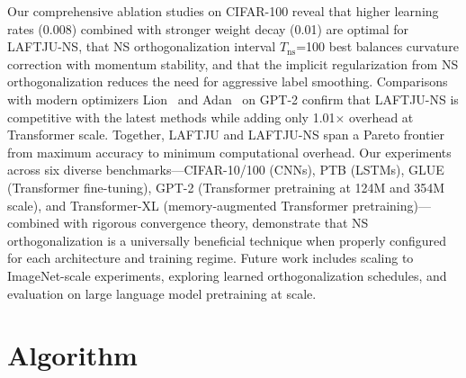 \documentclass[10pt,twocolumn]{article}
\newcommand{\method}{LAFTJU}
\begin{document}
Our comprehensive ablation studies on CIFAR-100 reveal that higher learning rates (0.008) combined with stronger weight decay (0.01) are optimal for \method{}-NS, that NS orthogonalization interval $T_\mathrm{ns}$=100 best balances curvature correction with momentum stability, and that the implicit regularization from NS orthogonalization reduces the need for aggressive label smoothing. Comparisons with modern optimizers Lion~\cite{lion} and Adan~\cite{adan} on GPT-2 confirm that \method{}-NS is competitive with the latest methods while adding only 1.01$\times$ overhead at Transformer scale. Together, \method{} and \method{}-NS span a Pareto frontier from maximum accuracy to minimum computational overhead. Our experiments across six diverse benchmarks---CIFAR-10/100 (CNNs), PTB (LSTMs), GLUE (Transformer fine-tuning), GPT-2 (Transformer pretraining at 124M and 354M scale), and Transformer-XL (memory-augmented Transformer pretraining)---combined with rigorous convergence theory, demonstrate that NS orthogonalization is a universally beneficial technique when properly configured for each architecture and training regime. Future work includes scaling to ImageNet-scale experiments, exploring learned orthogonalization schedules, and evaluation on large language model pretraining at scale.

\appendix
\section{Algorithm}
\end{document}
